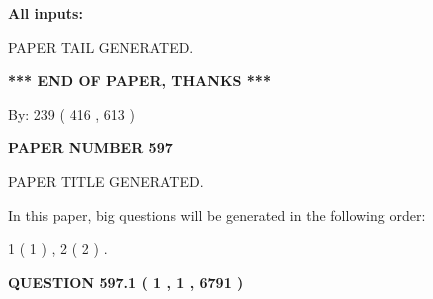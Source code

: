 \documentclass[12pt]{article}
\begin{document}
   
   
   
\noindent{}
   
   
   
   
\noindent\vspace{0.1in}\hspace{-0.08in} {\textbf{\Large{All inputs: }}}
   
   
   
   
   
   
 \vspace{0.2in}
 
   
   
\vspace{2.0in} PAPER TAIL GENERATED.
   
   
   
   
\vspace{1.0in} 
{\textbf{\large{ *** END OF PAPER, THANKS *** }}} 
   
   
\hspace{1.0in} By: 
 239 ( 416 ,  613 )
   
   
   
   
\newpage 
\setcounter{page}{ 
   597001 } 
   
   
   
   
 {\textbf{ \Large{ PAPER NUMBER  597  }}}
   
   
\vspace{0.2in}
   
   
   
   
   
   
   
   
 \vspace{0.2in}
 
 
 
 
   
   
 PAPER TITLE GENERATED.
   
   
   
\vspace{0.2in}
   
In this paper, big questions will be generated in the following order: 
   
   
   1 ( 1 )
 ,
   2 ( 2 )
 .
  
\vspace{0.2in}
  
{\textbf{\Large{QUESTION
597.1 
 ( 1 , 1 , 6791 )
}}}
  
\end{document}
